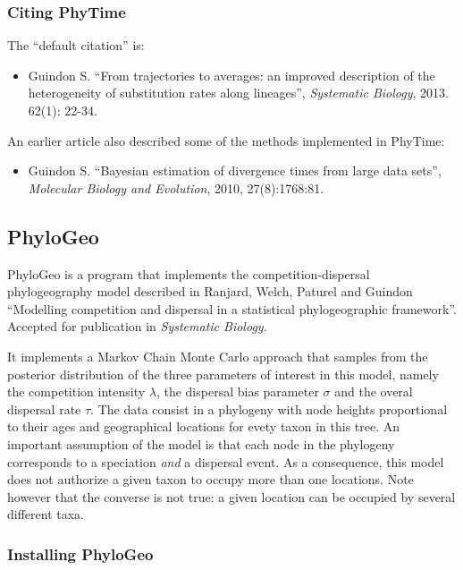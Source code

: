 \documentclass[a4paper,12pt]{article}
\begin{document}
\subsubsection{Citing PhyTime}\label{sec:citephytime}

The ``default citation'' is:

\begin{itemize}
\item Guindon S. ``From trajectories to averages: an improved description of the heterogeneity of
substitution rates along lineages'', {\it Systematic Biology}, 2013. 62(1): 22-34.
\end{itemize}

An earlier article also described some of the methods implemented in PhyTime:

\begin{itemize}
\item Guindon  S. ``Bayesian estimation of divergence  times from large data  sets'', {\it Molecular
    Biology and Evolution}, 2010,
27(8):1768:81.
\end{itemize}



\subsection{PhyloGeo} PhyloGeo is  a program that implements the
competition-dispersal phylogeography model described in Ranjard, Welch, Paturel and Guindon
``Modelling competition  and  dispersal in a statistical phylogeographic framework''. Accepted for
publication in {\it Systematic Biology}.

It implements a  Markov Chain Monte Carlo  approach that samples from the  posterior distribution of
the three  parameters of  interest in this  model, namely  the competition intensity  $\lambda$, the
dispersal  bias parameter  $\sigma$ and  the overal  dispersal rate  $\tau$. The  data consist  in a
phylogeny with node heights proportional to their ages and geographical locations for evety taxon in
this tree. An important assumption of the model is that each node in the phylogeny corresponds to a
speciation {\em and} a dispersal event. As a consequence, this model does not authorize a given taxon to
occupy more than one locations. Note however that the converse is not true: a given location can be
occupied by several different taxa.

\subsubsection{Installing PhyloGeo}
\end{document}

